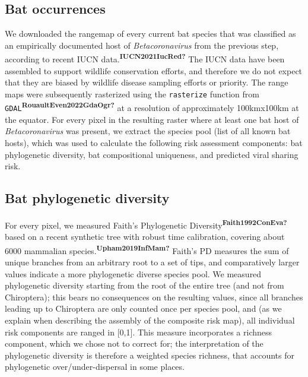 \documentclass[10pt,oneside]{article}
\begin{document}
\hypertarget{bat-occurrences}{%
\subsection{Bat occurrences}\label{bat-occurrences}}

We downloaded the rangemap of every current bat species that was
classified as an empirically documented host of \emph{Betacoronavirus}
from the previous step, according to recent IUCN
data.\textsuperscript{\textbf{IUCN2021IucRed?}} The IUCN data have been
assembled to support wildlife conservation efforts, and therefore we do
not expect that they are biased by wildlife disease sampling efforts or
priority. The range maps were subsequently rasterized using the
\texttt{rasterize} function from
\texttt{GDAL}\textsuperscript{\textbf{RouaultEven2022GdaOgr?}} at a
resolution of approximately 100kmx100km at the equator. For every pixel
in the resulting raster where at least one bat host of
\emph{Betacoronavirus} was present, we extract the species pool (list of
all known bat hosts), which was used to calculate the following risk
assessment components: bat phylogenetic diversity, bat compositional
uniqueness, and predicted viral sharing risk.

\hypertarget{bat-phylogenetic-diversity}{%
\subsection{Bat phylogenetic
diversity}\label{bat-phylogenetic-diversity}}

For every pixel, we measured Faith's Phylogenetic
Diversity\textsuperscript{\textbf{Faith1992ConEva?}} based on a recent
synthetic tree with robust time calibration, covering about 6000
mammalian species.\textsuperscript{\textbf{Upham2019InfMam?}} Faith's PD
measures the sum of unique branches from an arbitrary root to a set of
tips, and comparatively larger values indicate a more phylogenetic
diverse species pool. We measured phylogenetic diversity starting from
the root of the entire tree (and not from Chiroptera); this bears no
consequences on the resulting values, since all branches leading up to
Chiroptera are only counted once per species pool, and (as we explain
when describing the assembly of the composite risk map), all individual
risk components are ranged in {[}0,1{]}. This measure incorporates a
richness component, which we chose not to correct for; the
interpretation of the phylogenetic diversity is therefore a weighted
species richness, that accounts for phylogenetic over/under-dispersal in
some places.
\end{document}
